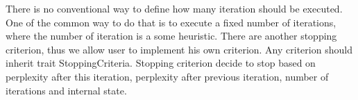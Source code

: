 There is no conventional way to define how many iteration should be executed. One of the common way to do that is to execute a fixed number of
iterations, where the number of iteration is a some heuristic. There are another stopping criterion, thus we allow user to implement his own
criterion. Any criterion should inherit trait StoppingCriteria. Stopping criterion decide to stop based on perplexity after this iteration, perplexity after
previous iteration, number of iterations and internal state. 
